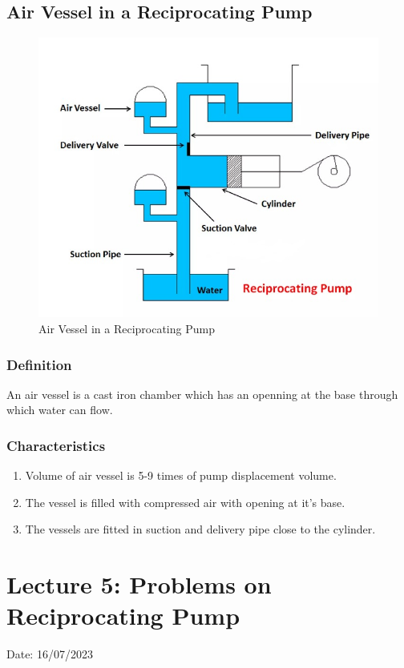 \documentclass{article}
\begin{document}
  \subsection*{Air Vessel in a Reciprocating Pump}
  \begin{figure}[h]
    \begin{center}
      \includegraphics*[width=0.7\linewidth]{img/air_vessel.jpeg}
      \caption*{Air Vessel in a Reciprocating Pump}
    \end{center}
    \end{figure}

    \subsubsection*{Definition}
    An air vessel is a cast iron chamber which has an openning at the base through which water can flow.

    \subsubsection*{Characteristics}
    \begin{enumerate}
      \item Volume of air vessel is 5-9 times of pump displacement volume. 
      \item The vessel is filled with compressed air with opening at it's base. 
      \item The vessels are fitted in suction and delivery pipe close to the cylinder. 
    \end{enumerate}

    \section{Lecture 5: Problems on Reciprocating Pump}
    \hfill Date: 16/07/2023
\end{document}
